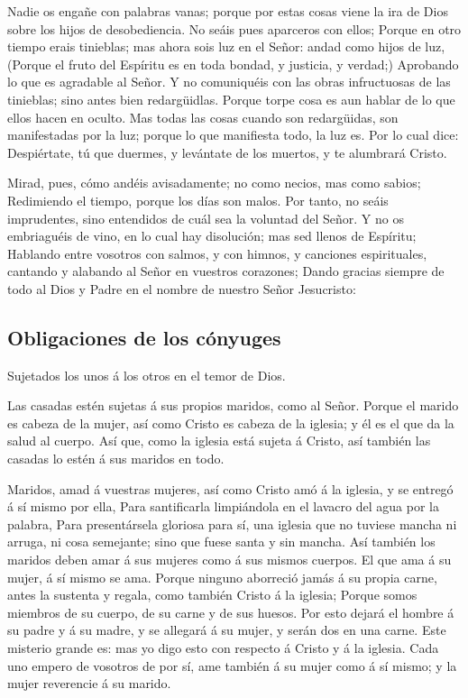  Nadie os engañe con palabras vanas; porque por estas cosas
viene la ira de Dios sobre los hijos de desobediencia.  No
seáis pues aparceros con ellos;  Porque en otro tiempo erais
tinieblas; mas ahora sois luz en el Señor: andad como hijos de luz,
 (Porque el fruto del Espíritu es en toda bondad, y
justicia, y verdad;)  Aprobando lo que es agradable al
Señor.  Y no comuniquéis con las obras infructuosas de las
tinieblas; sino antes bien redargüidlas.  Porque torpe cosa
es aun hablar de lo que ellos hacen en oculto.  Mas todas
las cosas cuando son redargüidas, son manifestadas por la luz; porque lo
que manifiesta todo, la luz es.  Por lo cual dice:
Despiértate, tú que duermes, y levántate de los muertos, y te alumbrará
Cristo.

 Mirad, pues, cómo andéis avisadamente; no como necios, mas
como sabios;  Redimiendo el tiempo, porque los días son
malos.  Por tanto, no seáis imprudentes, sino entendidos de
cuál sea la voluntad del Señor.  Y no os embriaguéis de
vino, en lo cual hay disolución; mas sed llenos de Espíritu;
 Hablando entre vosotros con salmos, y con himnos, y
canciones espirituales, cantando y alabando al Señor en vuestros
corazones;  Dando gracias siempre de todo al Dios y Padre
en el nombre de nuestro Señor Jesucristo:

\hypertarget{obligaciones-de-los-cuxf3nyuges}{%
\subsection{Obligaciones de los
cónyuges}\label{obligaciones-de-los-cuxf3nyuges}}

 Sujetados los unos á los otros en el temor de Dios.

 Las casadas estén sujetas á sus propios maridos, como al
Señor.  Porque el marido es cabeza de la mujer, así como
Cristo es cabeza de la iglesia; y él es el que da la salud al cuerpo.
 Así que, como la iglesia está sujeta á Cristo, así también
las casadas lo estén á sus maridos en todo.

 Maridos, amad á vuestras mujeres, así como Cristo amó á la
iglesia, y se entregó á sí mismo por ella,  Para
santificarla limpiándola en el lavacro del agua por la palabra,
 Para presentársela gloriosa para sí, una iglesia que no
tuviese mancha ni arruga, ni cosa semejante; sino que fuese santa y sin
mancha.  Así también los maridos deben amar á sus mujeres
como á sus mismos cuerpos. El que ama á su mujer, á sí mismo se ama.
 Porque ninguno aborreció jamás á su propia carne, antes la
sustenta y regala, como también Cristo á la iglesia; 
Porque somos miembros de su cuerpo, de su carne y de sus huesos.
 Por esto dejará el hombre á su padre y á su madre, y se
allegará á su mujer, y serán dos en una carne.  Este
misterio grande es: mas yo digo esto con respecto á Cristo y á la
iglesia.  Cada uno empero de vosotros de por sí, ame
también á su mujer como á sí mismo; y la mujer reverencie á su marido.

